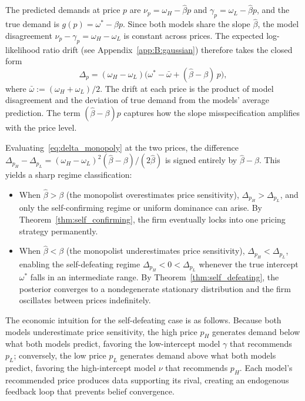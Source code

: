 \documentclass[12pt]{article}
\begin{document}
The predicted demands at price $p$ are $\nu_p = \omega_H - \hat{\beta}p$ and $\gamma_p = \omega_L - \hat{\beta}p$, and the true demand is $g(p) = \omega^* - \beta p$. Since both models share the slope $\hat{\beta}$, the model disagreement $\nu_p - \gamma_p = \omega_H - \omega_L$ is constant across prices. The expected log-likelihood ratio drift (see Appendix~\ref{app:B:gaussian}) therefore takes the closed form
\begin{equation}
\label{eq:delta_monopoly}
\Delta_p = (\omega_H - \omega_L)\bigl(\omega^* - \bar{\omega} + (\hat{\beta} - \beta)\,p\bigr),
\end{equation}
where $\bar{\omega} := (\omega_H + \omega_L)/2$. The drift at each price is the product of model disagreement and the deviation of true demand from the models' average prediction. The term $(\hat{\beta}-\beta)p$ captures how the slope misspecification amplifies with the price level.

Evaluating~\eqref{eq:delta_monopoly} at the two prices, the difference $\Delta_{p_H} - \Delta_{p_L} = (\omega_H - \omega_L)^2(\hat{\beta}-\beta)/(2\hat{\beta})$ is signed entirely by $\hat{\beta} - \beta$. This yields a sharp regime classification:
\begin{itemize}
\item When $\hat{\beta} > \beta$ (the monopolist overestimates price sensitivity), $\Delta_{p_H} > \Delta_{p_L}$, and only the self-confirming regime or uniform dominance can arise. By Theorem~\ref{thm:self_confirming}, the firm eventually locks into one pricing strategy permanently.
\item When $\hat{\beta} < \beta$ (the monopolist underestimates price sensitivity), $\Delta_{p_H} < \Delta_{p_L}$, enabling the self-defeating regime $\Delta_{p_H} < 0 < \Delta_{p_L}$ whenever the true intercept $\omega^*$ falls in an intermediate range. By Theorem~\ref{thm:self_defeating}, the posterior converges to a nondegenerate stationary distribution and the firm oscillates between prices indefinitely.
\end{itemize}
The economic intuition for the self-defeating case is as follows. Because both models underestimate price sensitivity, the high price $p_H$ generates demand below what both models predict, favoring the low-intercept model $\gamma$ that recommends $p_L$; conversely, the low price $p_L$ generates demand above what both models predict, favoring the high-intercept model $\nu$ that recommends $p_H$. Each model's recommended price produces data supporting its rival, creating an endogenous feedback loop that prevents belief convergence.
\end{document}
